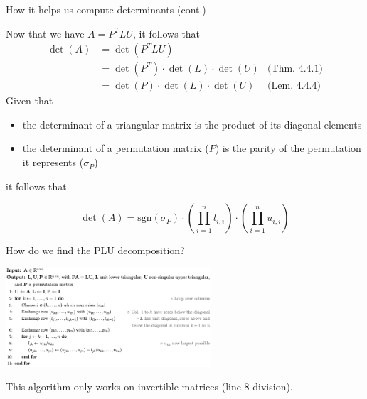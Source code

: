 \documentclass{beamer}
\begin{document}
\begin{frame}{How it helps us compute determinants (cont.)}

    Now that we have $A=P^T LU$, it follows that
    \begin{align*}
        \det(A)  & = \det(P^T L U) & \\
                 & = \det(P^T)\cdot \det(L)\cdot \det(U) & \text{(Thm. 4.4.1)} \\
                 & = \det(P)\cdot \det(L)\cdot \det(U)   & \text{(Lem. 4.4.4)}
    \end{align*}
    Given that
    \begin{itemize}
        \item the determinant of a triangular matrix is the product of its diagonal elements
        \item the determinant of a permutation matrix ($P$) is the parity of the permutation
            it represents ($\sigma_P$)
    \end{itemize}
    it follows that
    \begin{block}{}
        \[
            \det(A) = \text{sgn}(\sigma_P) \cdot \left( \prod_{i=1}^{n} l_{i,i} \right) \cdot
            \left( \prod_{i=1}^{n} u_{i,i} \right)
        \]
    \end{block}

\end{frame}

\begin{frame}{How do we find the PLU decomposition?}

    \begin{center}{}
        \includegraphics[height=140]{PLUcode.png}
    \end{center}

    \begin{alertblock}{}
        This algorithm only works on invertible matrices (line 8 division).
    \end{alertblock}

\end{frame}
\end{document}
